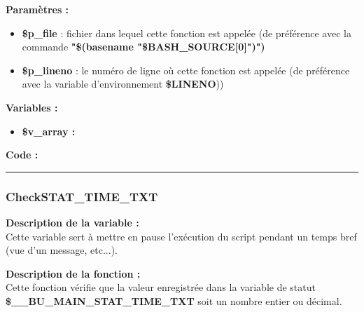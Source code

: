 \documentclass[a4paper,10pt]{article}
\begin{document}
\begin{justify}
    \textbf{Paramètres :}

    \begin{itemize}
        \item \color{orange}\textbf{\$p\_file}\color{white} : fichier dans lequel cette fonction est appelée (de préférence avec la commande \textbf{"\$(\color{gray}basename \color{white}"\color{orange}\$BASH\_SOURCE[0]\color{white}")")}\\

        \item \color{orange}\textbf{\$p\_lineno}\color{white} : le numéro de ligne où cette fonction est appelée (de préférence avec la variable d'environnement \textbf{\color{orange}\$LINENO}))
    \end{itemize}
\end{justify}

\begin{justify}
    \textbf{Variables :}

    \begin{itemize}
        \item \textbf{\color{orange}\$v\_array\color{white} :}
    \end{itemize}
\end{justify}

\begin{justify}
    \textbf{Code :}
\end{justify}



\color{blue}\par\noindent\rule{\textwidth}{0.4pt}\color{white}

\color{blue}
\subsubsection{CheckSTAT\_TIME\_TXT}\color{white}

\begin{justify}
    \textbf{Description de la variable :}\\
    Cette variable sert à mettre en pause l'exécution du script pendant un temps bref (vue d'un message, etc...).
\end{justify}

\begin{justify}
    \textbf{Description de la fonction :}\\
    Cette fonction vérifie que la valeur enregistrée dans la variable de statut \textbf{\color{orange}\$\_\_BU\_MAIN\_STAT\_TIME\_TXT} soit un nombre entier ou décimal.
\end{justify}
\end{document}
